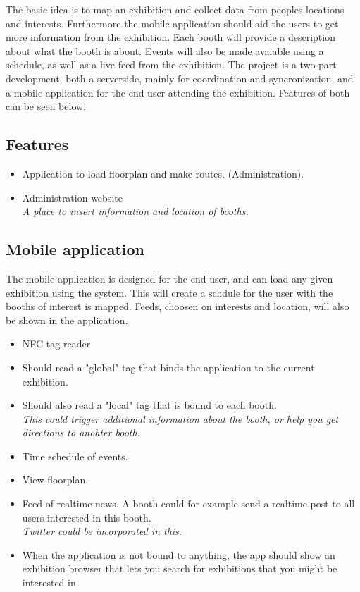 The basic idea is to map an exhibition and collect data from peoples locations and interests. Furthermore the mobile application should aid the users to get more information from the exhibition. Each booth will provide a description about what the booth is about. Events will also be made avaiable using a schedule, as well as a live feed from the exhibition.
The project is a two-part development, both a serverside, mainly for coordination and syncronization, and a mobile application for the end-user attending the exhibition. Features of both can be seen below.

\subsection*{Features}

\begin{itemize}
\item Application to load floorplan and make routes. (Administration).

\item Administration website\\
\textit{A place to insert information and location of booths.}
\end{itemize}

\subsection*{Mobile application}
The mobile application is designed for the end-user, and can load any given exhibition using the system. This will create a schdule for the user with the booths of interest is mapped. Feeds, choosen on interests and location, will also be shown in the application.

\begin{itemize}
\item NFC tag reader

\item Should read a "global" tag that binds the application to the current exhibition.

\item Should also read a "local" tag that is bound to each booth.\\
\textit{This could trigger additional information about the booth, or help you get directions to anohter booth.}
\item Time schedule of events.

\item View floorplan.

\item Feed of realtime news. A booth could for example send a realtime post to all users interested in this booth.\\
\textit{Twitter could be incorporated in this.}

\item When the application is not bound to anything, the app should show an exhibition browser that lets you search for exhibitions that you might be interested in.
\end{itemize}

